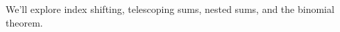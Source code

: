 \documentclass[preview]{standalone}
\begin{document}
\begin{center}
We'll explore index shifting, telescoping sums, nested sums, and the binomial theorem.
\end{center}
\end{document}
